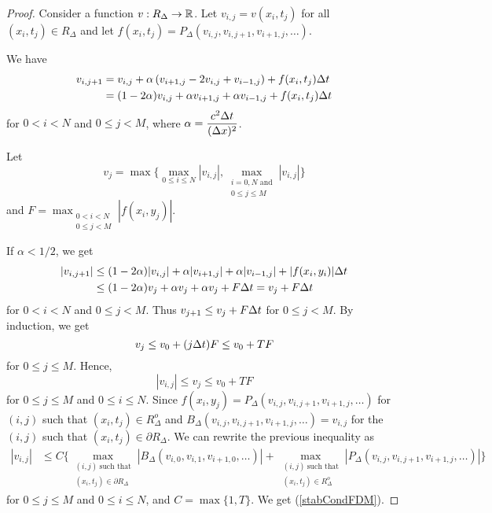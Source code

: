 \begin{proof}
Consider a function $v:R_\Delta \to \mathbb{R}$.  Let $v_{i,j} = v(x_i,t_j)$
for all $(x_i,t_j) \in R_\Delta$ and let
$f(x_i,t_j) = P_\Delta(v_{i,j},v_{i,j+1},v_{i+1,j},\ldots)$.

We have
\begin{align*}
v_{i,j+1} &= v_{i,j} +\alpha \left(v_{i+1,j} - 2v_{i,j} +
  v_{i-1,j}\right) + f(x_i,t_j) \Delta{t} \\
&= (1-2\alpha) v_{i,j} +\alpha v_{i+1,j} + \alpha v_{i-1,j}
+ f(x_i,t_j) \Delta{t}
\end{align*}
for $0<i<N$ and $0\leq j < M$,
where $\displaystyle \alpha = \frac{c^2\Delta{t}}{(\Delta{x})^2}$.

Let
\[
v_j = \max\bigg\{ \max_{0\leq i \leq N} |v_{i,j}|, 
\max_{\substack{i=0,N \text{ and}\\0\leq j \leq M}} |v_{i,j}|
\bigg\}
\]
and
$\displaystyle F = \max_{\substack{0<i<N\\0\leq j<M}} |f(x_i,y_j)|$.

If $\alpha < 1/2$, we get
\begin{align*}
|v_{i,j+1}| &\leq (1-2\alpha) |v_{i,j}| +\alpha |v_{i+1,j}| + \alpha |v_{i-1,j}|
+ |f(x_i,y_i)| \Delta{t} \\
&\leq (1-2\alpha) v_j +\alpha v_j + \alpha v_j + F \Delta{t}
  = v_j + F \Delta{t}
\end{align*}
for $0<i<N$ and $0\leq j < M$.  Thus
$\displaystyle v_{j+1} \leq v_j + F \Delta{t}$ for $0\leq j < M$.
By induction, we get
\[
  v_j \leq v_0 + (j \Delta{t}) F \leq v_0 + T F 
\]
for $0\leq j \leq M$.  Hence,
\[
  |v_{i,j}| \leq v_j \leq v_0 + T F
\]
for $0\leq j \leq M$ and $0\leq i \leq N$.  Since
$f(x_i,y_j) = P_\Delta(v_{i,j},v_{i,j+1},v_{i+1,j},\ldots)$
for $(i,j)$ such that $(x_i,t_j) \in R_\Delta^o$
and $B_\Delta(v_{i,j},v_{i,j+1},v_{i+1,j},\ldots) = v_{i,j}$ for the
$(i,j)$ such that $(x_i,t_j) \in \partial R_\Delta$.  We can
rewrite the previous inequality as
\begin{align*}
|v_{i,j}| &\leq C \bigg\{
\max_{\substack{(i,j)\ \text{such that}\\(x_i,t_j) \in \partial R_\Delta}}
|B_\Delta(v_{i,0},v_{i,1},v_{i+1,0},\ldots)|
+ \max_{\substack{(i,j)\ \text{such that}\\(x_i,t_j) \in R_\Delta^o}}
|P_\Delta(v_{i,j},v_{i,j+1},v_{i+1,j},\ldots)| \bigg\}
\end{align*}
for $0\leq j \leq M$ and $0\leq i \leq N$, and $C = \max \{1, T\}$.
We get (\ref{stabCondFDM}).
\end{proof}

